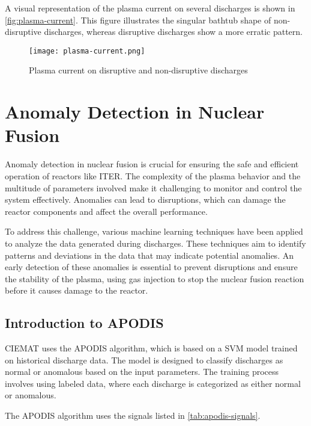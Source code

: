 A visual representation of the plasma current on several discharges is shown in \autoref{fig:plasma-current}. This figure illustrates the singular bathtub shape of non-disruptive discharges, whereas disruptive discharges show a more erratic pattern.

\begin{figure}[H]
    \centering
    \texttt{[image: plasma-current.png]}
    \caption{Plasma current on disruptive and non-disruptive discharges}
    \label{fig:plasma-current}
\end{figure}

\section{Anomaly Detection in Nuclear Fusion}

Anomaly detection in nuclear fusion is crucial for ensuring the safe and efficient operation of reactors like \ac{ITER}. The complexity of the plasma behavior and the multitude of parameters involved make it challenging to monitor and control the system effectively. Anomalies can lead to disruptions, which can damage the reactor components and affect the overall performance.

To address this challenge, various machine learning techniques have been applied to analyze the data generated during discharges. These techniques aim to identify patterns and deviations in the data that may indicate potential anomalies. An early detection of these anomalies is essential to prevent disruptions and ensure the stability of the plasma, using gas injection to stop the nuclear fusion reaction before it causes damage to the reactor.

\subsection{Introduction to \acs{APODIS}}

\ac{CIEMAT} uses the \ac{APODIS} algorithm, which is based on a \ac{SVM} model trained on historical discharge data. The model is designed to classify discharges as normal or anomalous based on the input parameters. The training process involves using labeled data, where each discharge is categorized as either normal or anomalous.

The \ac{APODIS} algorithm uses the signals listed in \autoref{tab:apodis-signals}.

